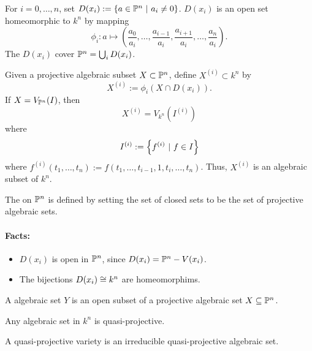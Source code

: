For $i = 0,\ldots, n$, set $D(x_i) := \set{a \in \P^n}{a_i \neq 0}$. $D(x_i)$ is an open set homeomorphic to $k^n$ by mapping
\[ \phi_i : a \longmapsto (\frac{a_0}{a_i}, \ldots,\frac{a_{i-1}}{a_i},\frac{a_{i+1}}{a_i},\ldots, \frac{a_{n}}{a_i} ). \]
The $D(x_i)$ cover $\P^n = \bigcup_i D(x_i)$.

Given a projective algebraic subset $X \subset \P^n$, define $X^{(i)} \subset k^n$ by
\[ X^{(i)} := \phi_i (X \cap D(x_i)) .\]
If $X = V_{\P^n}(I)$, then
\[ X^{(i)} = V_{k^n}(I^{(i)}) \]
where
\[ I^{(i)} := \set{f^{(i)}}{f \in I} \]
where $f^{(i)} (t_1,\ldots, t_n) := f(t_1,\ldots, t_{i-1}, 1, t_i, \ldots, t_n)$. Thus, $X^{(i)}$ is an algebraic subset of $k^n$.
\begin{definition}
The  on $\P^n$ is defined by setting the set of closed sets to be the set of projective algebraic sets.
\end{definition}
\paragraph{Facts:}
\begin{itemize}
	\item $D(x_i)$ is open in $\P^n$, since $D(x_i) = \P^n - V(x_i)$.
	\item The bijections $D(x_i) \isom{} k^n$ are homeomorphims.
\end{itemize}
\begin{definition}
	A  algebraic set $Y$ is an open subset of a projective algebraic set $X \subseteq \P^n$.
\end{definition}
\begin{example}
	Any algebraic set in $k^n$ is quasi-projective.
\end{example}
\begin{definition}
A quasi-projective variety is an irreducible quasi-projective algebraic set.
\end{definition}
